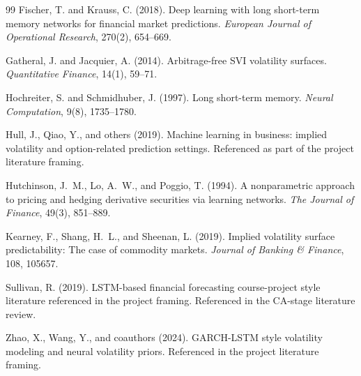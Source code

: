 \documentclass[12pt]{report}
\begin{document}
\begin{thebibliography}{99}
Fischer, T. and Krauss, C. (2018).
\newblock Deep learning with long short-term memory networks for financial market predictions.
\newblock \emph{European Journal of Operational Research}, 270(2), 654--669.

Gatheral, J. and Jacquier, A. (2014).
\newblock Arbitrage-free SVI volatility surfaces.
\newblock \emph{Quantitative Finance}, 14(1), 59--71.

Hochreiter, S. and Schmidhuber, J. (1997).
\newblock Long short-term memory.
\newblock \emph{Neural Computation}, 9(8), 1735--1780.

Hull, J., Qiao, Y., and others (2019).
\newblock Machine learning in business: implied volatility and option-related prediction settings.
\newblock Referenced as part of the project literature framing.

Hutchinson, J.~M., Lo, A.~W., and Poggio, T. (1994).
\newblock A nonparametric approach to pricing and hedging derivative securities via learning networks.
\newblock \emph{The Journal of Finance}, 49(3), 851--889.

Kearney, F., Shang, H.~L., and Sheenan, L. (2019).
\newblock Implied volatility surface predictability: The case of commodity markets.
\newblock \emph{Journal of Banking \& Finance}, 108, 105657.

Sullivan, R. (2019).
\newblock LSTM-based financial forecasting course-project style literature referenced in the project framing.
\newblock Referenced in the CA-stage literature review.

Zhao, X., Wang, Y., and coauthors (2024).
\newblock GARCH-LSTM style volatility modeling and neural volatility priors.
\newblock Referenced in the project literature framing.

\end{thebibliography}
\end{document}
